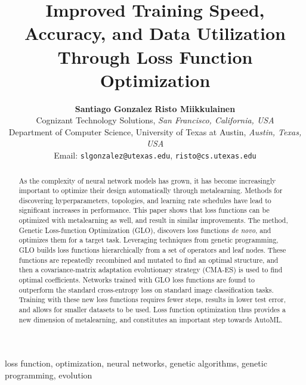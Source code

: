 \documentclass[conference]{IEEEtran}
\begin{document}
\title{Improved Training Speed, Accuracy, and Data Utilization Through Loss Function Optimization}

\author{\textbf{Santiago Gonzalez}  \textbf{Risto Miikkulainen} \\
	Cognizant Technology Solutions, \emph{San Francisco, California, USA} \\
	Department of Computer Science, University of Texas at Austin, \emph{Austin, Texas, USA} \\
	Email: \texttt{slgonzalez@utexas.edu}, \texttt{risto@cs.utexas.edu}
}



\maketitle

\begin{abstract}
As the complexity of neural network models has grown, it has become
increasingly important to optimize their design automatically through
metalearning. Methods for discovering hyperparameters, topologies, and
learning rate schedules have lead to significant increases in
performance. This paper shows that loss functions can be optimized
with metalearning as well, and result in similar improvements. The
method, Genetic Loss-function Optimization (GLO), discovers loss
functions \emph{de novo}, and optimizes them for a target task. Leveraging
techniques from genetic programming, GLO builds loss functions
hierarchically from a set of operators and leaf nodes. These functions
are repeatedly recombined and mutated to find an optimal structure,
and then a covariance-matrix adaptation evolutionary strategy (CMA-ES)
is used to find optimal coefficients. Networks trained with GLO loss
functions are found to outperform the standard cross-entropy loss on
standard image classification tasks. Training with these new loss
functions requires fewer steps, results in lower test error, and
allows for smaller datasets to be used. Loss function optimization
thus provides a new dimension of metalearning, and constitutes an
important step towards AutoML.
\end{abstract}

\begin{IEEEkeywords}
loss function, optimization, neural networks, genetic algorithms, genetic programming, evolution
\end{IEEEkeywords}
\end{document}
